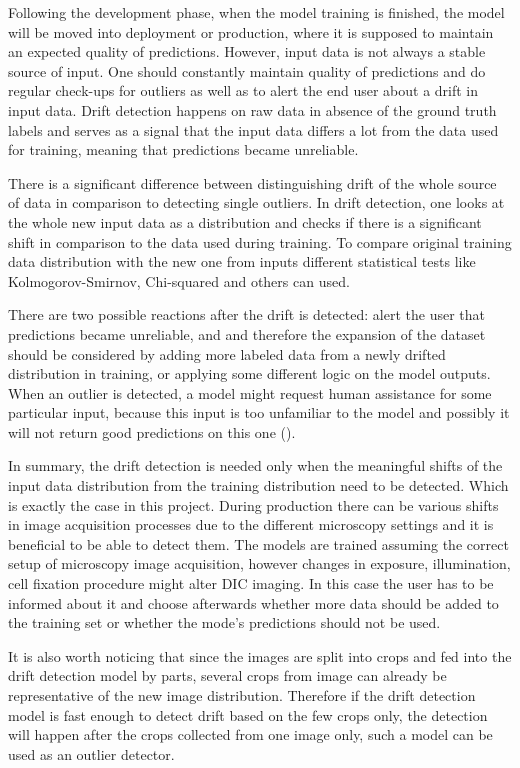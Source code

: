 Following the development phase, when the model training is finished, the model will be moved into deployment or production, where it is supposed to maintain an expected quality of predictions. However, input data is not always a stable source of input. One should constantly maintain quality of predictions and do regular check-ups for outliers as well as to alert the end user about a drift in input data. Drift detection happens on raw data in absence of the ground truth labels and serves as a signal that the input data differs a lot from the data used for training, meaning that predictions became unreliable.

There is a significant difference between distinguishing drift of the whole source of data in comparison to detecting single outliers. In drift detection, one looks at the whole new input data as a distribution and checks if there is a significant shift in comparison to the data used during training. To compare original training data distribution with the new one from inputs different statistical tests like Kolmogorov-Smirnov, Chi-squared and others can used.

There are two possible reactions after the drift is detected: alert the user that predictions became unreliable, and and therefore the expansion of the dataset should be considered by adding more labeled data from a newly drifted distribution in training, or applying some different logic on the model outputs. When an outlier is detected, a model might request human assistance for some particular input, because this input is too unfamiliar to the model and possibly it will not return good predictions on this one (\cite{samuylova_2021}). 

In summary, the drift detection is needed only when the meaningful shifts of the input data distribution from the training distribution need to be detected. Which is exactly the case in this project. During production there can be various shifts in image acquisition processes due to the different microscopy settings and it is beneficial to be able to detect them. The models are trained assuming the correct setup of microscopy image acquisition, however changes in exposure, illumination, cell fixation procedure might alter DIC imaging. In this case the user has to be informed about it and choose afterwards whether more data should be added to the training set or whether the mode's predictions should not be used.

It is also worth noticing that since the images are split into crops and fed into the drift detection model by parts, several crops from image can already be representative of the new image distribution. Therefore if the drift detection model is fast enough to detect drift based on the few crops only, the detection will happen after the crops collected from one image only, such a model can be used as an outlier detector.
